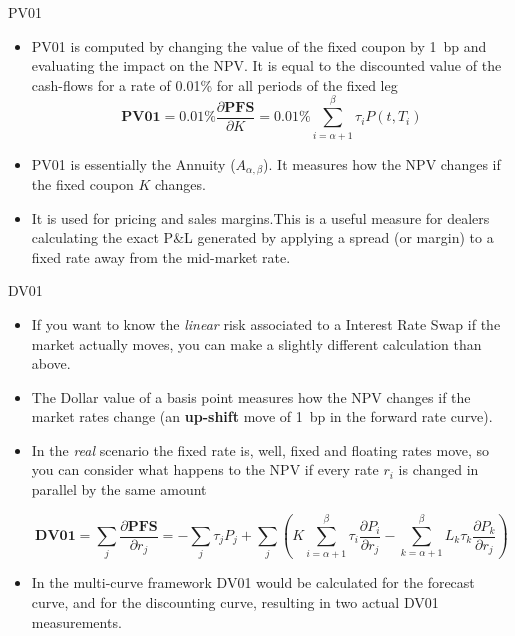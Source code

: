 \documentclass{beamer}
\begin{document}
	\begin{frame}{PV01}
		\begin{itemize}
			\item<1-> \textcolor{maincolor}{PV01} is computed by changing the value of the fixed coupon by 1~bp and evaluating the impact on the NPV. It is equal to the discounted value of the cash-flows for a rate of 0.01\% for all periods of the fixed leg
			\begin{equation}
				\textbf{PV01} = 0.01\% \frac{\partial \textbf{PFS}}{\partial K} = 0.01\% \sum_{i=\alpha+1}^\beta\tau_iP(t,T_i)
			\end{equation}
			\item<2-> PV01 is essentially the Annuity ($A_{\alpha,\beta}$). It measures how the NPV changes if the fixed coupon $K$ changes.
			\item<3-> It is used for pricing and sales margins.This is a useful measure for dealers calculating the exact P\&L generated by applying a spread (or margin) to a fixed rate away from the mid-market rate.
		\end{itemize}
	\end{frame}

	\begin{frame}{DV01}
		\begin{itemize}
			\item<1-> If you want to know the \emph{linear} risk associated to a Interest Rate Swap if the market actually moves, you can make a slightly different calculation than above.
			\item<2-> The \textcolor{maincolor}{Dollar value of a basis point} measures how the NPV changes if the market rates change (an \textbf{up-shift} move of 1~bp in the forward rate curve).
			\item<3-> In the \emph{real} scenario the fixed rate is, well, fixed and floating rates move, so you can consider what happens to the NPV if every rate $r_i$ is changed in parallel by the same amount

			\begin{equation*}
				\textbf{DV01} = \sum_j \frac{\partial \textbf{PFS}}{\partial r_j} = -\sum_{j}\tau_jP_j+\sum_{j}\left(K\sum_{i=\alpha+1}^\beta\tau_i\frac{\partial P_i}{\partial r_j} - \sum_{k=\alpha+1}^\beta L_k\tau_k\frac{\partial P_k}{\partial r_j}\right)
			\end{equation*}
			\item<4-> In the multi-curve framework DV01 would be calculated for the forecast curve, and for the discounting curve, resulting in two actual DV01 measurements.
		\end{itemize}
	\end{frame}
\end{document}
